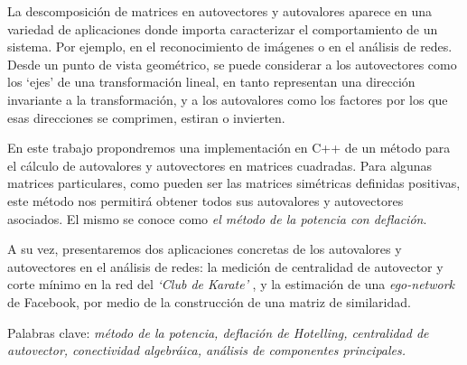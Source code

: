 La descomposición de matrices en autovectores y autovalores aparece en una variedad de aplicaciones donde importa caracterizar el comportamiento de un sistema. Por ejemplo, en el reconocimiento de imágenes o en el análisis de redes. Desde un punto de vista geométrico, se puede considerar a los autovectores como los `ejes' de una transformación lineal, en tanto representan una dirección invariante a la transformación, y a los autovalores como los factores por los que esas direcciones se comprimen, estiran o invierten. 

\vspace{1em}
En este trabajo propondremos una implementación en C++ de un método para el cálculo de autovalores y autovectores en matrices cuadradas. Para algunas matrices particulares, como pueden ser las matrices simétricas definidas positivas, este método nos permitirá obtener todos sus autovalores y autovectores asociados. El mismo se conoce como \textit{el método de la potencia con deflación}. 

A su vez, presentaremos dos aplicaciones concretas de los autovalores y autovectores en el análisis de redes: la medición de centralidad de autovector y corte mínimo en la red del \textit{`Club de Karate'} \cite{Zachary}, y la estimación de una \textit{ego-network} \cite{Leskovec} de Facebook, por medio de la construcción de una matriz de similaridad.  

\vspace{1em}
\noindent Palabras clave: \textit{método de la potencia, deflación de Hotelling, centralidad de autovector, conectividad algebráica, análisis de componentes principales.}
